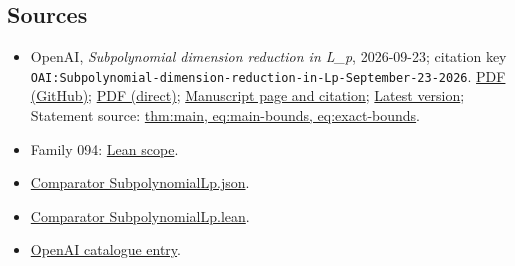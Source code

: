 \documentclass[11pt]{article}
\begin{document}
\subsection{Sources}
\begin{itemize}
\item OpenAI, \emph{Subpolynomial dimension reduction in L\_p}, 2026-09-23; citation key \texttt{OAI:Subpolynomial-dimension-reduction-in-Lp-September-23-2026}. \href{https://github.com/openai/math/blob/adc7f1241b42e322a6451854ab7e4b4c146bf78a/preprints/Subpolynomial-dimension-reduction-in-Lp-September-23-2026/paper.pdf}{PDF (GitHub)}; \href{https://github.com/openai/math/raw/adc7f1241b42e322a6451854ab7e4b4c146bf78a/preprints/Subpolynomial-dimension-reduction-in-Lp-September-23-2026/paper.pdf}{PDF (direct)}; \href{https://github.com/openai/math/blob/adc7f1241b42e322a6451854ab7e4b4c146bf78a/preprints/Subpolynomial-dimension-reduction-in-Lp-September-23-2026/README.md}{Manuscript page and citation}; \href{https://github.com/openai/math/blob/main/preprints/Subpolynomial-dimension-reduction-in-Lp-September-23-2026/paper.pdf}{Latest version}; Statement source: \href{https://github.com/openai/math/blob/adc7f1241b42e322a6451854ab7e4b4c146bf78a/preprints/Subpolynomial-dimension-reduction-in-Lp-September-23-2026/build/paper.tex\#L75}{thm:main, eq:main-bounds, eq:exact-bounds}.
\item Family 094: \href{https://github.com/openai/math/blob/adc7f1241b42e322a6451854ab7e4b4c146bf78a/lean/docs/094.md}{Lean scope}.
\item \href{https://github.com/openai/math/blob/adc7f1241b42e322a6451854ab7e4b4c146bf78a/lean/ComparatorChallenges/SubpolynomialLp.json}{Comparator SubpolynomialLp.json}.
\item \href{https://github.com/openai/math/blob/adc7f1241b42e322a6451854ab7e4b4c146bf78a/lean/ComparatorChallenges/SubpolynomialLp.lean}{Comparator SubpolynomialLp.lean}.
\item \href{https://github.com/openai/math/blob/adc7f1241b42e322a6451854ab7e4b4c146bf78a/CONTENTS.md}{OpenAI catalogue entry}.
\end{itemize}
\end{document}
